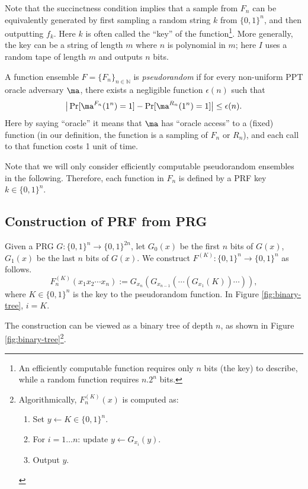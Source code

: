 Note that the succinctness condition implies that a sample from $F_n$ can be equivalently generated by first sampling a random string $k$ from $\{0, 1\}^n$, and then outputting $f_k$. Here $k$ is often called the ``key'' of the function\footnote{An efficiently computable function requires only $n$ bits (the key) to describe, while a random function requires $n.2^n$ bits.}. More generally, the key can be a string of length $m$ where $n$ is polynomial in $m$; here $I$ uses a random tape of length $m$ and outputs $n$ bits. %

\begin{definition}
    A function ensemble $F = \{F_n\}_{n \in \mathbb{N}}$ is \emph{pseudorandom} if
    for every non-uniform PPT oracle adversary $\ma$, there exists a negligible function $\epsilon(n)$ such that
    \[
        \big| \Pr[\ma^{F_n} (1^n) = 1] - \Pr[\ma^{R_n} (1^n) = 1]  \big| \leq \epsilon(n).
    \]
    Here by saying ``oracle'' it means that $\ma$ has ``oracle access'' to a (fixed) function (in our definition, the function is a sampling of $F_n$ or $R_n$), and each call to that function costs 1 unit of time.
\end{definition}

Note that we will only consider efficiently computable pseudorandom ensembles in the following. Therefore, each function in $F_n$ is defined by a PRF key $k \in \{0, 1\}^n$.


\subsection{Construction of PRF from PRG}

\begin{construction}
    Given a PRG $G: \{0, 1\}^n \rightarrow \{0, 1\}^{2n}$,
    let $G_0(x)$ be the first $n$ bits of $G(x)$, $G_1(x)$ be the last $n$ bits of $G(x)$.
    We construct $F^{(K)}: \{0, 1\}^n \rightarrow \{0, 1\}^n$ as follows.
    \[
        F^{(K)}_n(x_1 x_2 \cdots x_n) := G_{x_n}(G_{x_{n-1}} (\cdots(G_{x_1}(K)) \cdots  )),
    \]
    where $K \in \{0,1\}^n$ is the key to the pseudorandom function. In Figure \ref{fig:binary-tree}, $i = K$.
\end{construction}
The construction can be viewed as a binary tree of depth $n$, as shown in Figure \ref{fig:binary-tree}\footnote{Algorithmically, $F_n^{(K)}(x)$ is computed as:
\begin{enumerate}
    \item Set $y \gets K \in \{0, 1\}^n$.
    \item For $i = 1 \dots n$: update $y \gets G_{x_i}(y)$.
    \item Output $y$.
\end{enumerate}
}.

